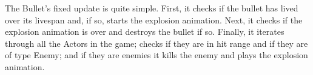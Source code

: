 The Bullet's fixed update is quite simple. First, it checks if the bullet has lived over 
its livespan and, if so, starts the explosion animation. Next, it checks if the explosion 
animation is over and destroys the bullet if so. Finally, it iterates through all the Actors in 
the game; checks if they are in hit range and if they are of type Enemy; and if they are enemies 
it kills the enemy and plays the explosion animation.
